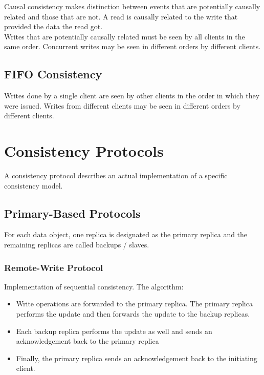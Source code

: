 \begin{multicols*}{2}
\noindent Causal consistency makes distinction between events that are potentially causally related and those that are not. A read is causally related to the write that provided the data the read got.\\

\noindent Writes that are potentially causally related must be seen by all clients in the same order. Concurrent writes may be seen in different orders by different clients.

\subsection{FIFO Consistency}

\noindent Writes done by a single client are seen by other clients in the order in which they were issued. Writes from different clients may be seen in different orders by different clients.

\section{Consistency Protocols}

\noindent A consistency protocol describes an actual implementation of a specific consistency model.

\subsection{Primary-Based Protocols}

\noindent For each data object, one replica is designated as the primary replica and the remaining replicas are called backups / slaves.

\subsubsection{Remote-Write Protocol}

\noindent Implementation of sequential consistency. The algorithm:

\begin{itemize}
  \item Write operations are forwarded to the primary replica. The primary replica performs the update and then forwards the update to the backup replicas.
  \item Each backup replica performs the update as well and sends an acknowledgement back to the primary replica
  \item Finally, the primary replica sends an acknowledgement back to the initiating client.
\end{itemize}


\end{multicols*}
